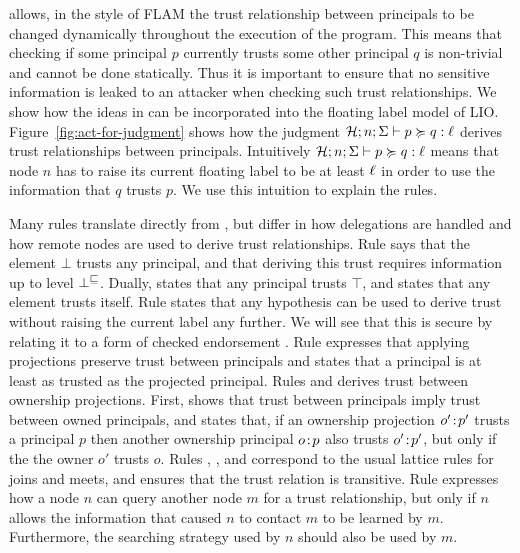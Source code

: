 \lang{} allows, in the style of FLAM \cite{Arden:2015:FA:2859845.2859998} the trust relationship between principals to be changed dynamically throughout the execution of the program. This means that checking if some principal $p$ currently trusts some other principal $q$ is non-trivial and cannot be done statically. Thus it is important to ensure that no sensitive information is leaked to an attacker when checking such trust relationships. We show how the ideas in \cite{Arden:2015:FA:2859845.2859998} can be incorporated into the floating label model of LIO. Figure~\ref{fig:act-for-judgment} shows how the judgment $\mathcal{H}; n; \Sigma \vdash p \succcurlyeq q : \ell$ derives trust relationships between principals. Intuitively $\mathcal{H}; n; \Sigma \vdash p \succcurlyeq q : \ell$ means that node $n$ has to raise its current floating label to be at least $\ell$ in order to use the information that $q$ trusts $p$. We use this intuition to explain the rules.

Many rules translate directly from \cite{Arden:2015:FA:2859845.2859998}, but differ in how delegations are handled and how remote nodes are used to derive trust relationships. Rule  says that the element $\bot$ trusts any principal, and that deriving this trust requires information up to level $\bot^{\sqsubseteq}$. Dually,  states that any principal trusts $\top$, and  states that any element trusts itself. Rule  states that any hypothesis can be used to derive trust without raising the current label any further. We will see that this is secure by relating it to a form of checked endorsement \cite{Chong:2007:SWA:1294261.1294265}. Rule  expresses that applying projections preserve trust between principals and  states that a principal is at least as trusted as the projected principal. Rules  and  derives trust between ownership projections. First,  shows that trust between principals imply trust between owned principals, and  states that, if an ownership projection $o'\!:\!p'$ trusts a principal $p$ then another ownership principal $o\!:\!p$ also trusts $o'\!:\!p'$, but only if the the owner $o'$ trusts $o$. Rules , ,  and  correspond to the usual lattice rules for joins and meets, and  ensures that the trust relation is transitive. Rule  expresses how a node $n$ can query another node $m$ for a trust relationship, but only if $n$ allows the information that caused $n$ to contact $m$ to be learned by $m$. Furthermore, the searching strategy used by $n$ should also be used by $m$.

